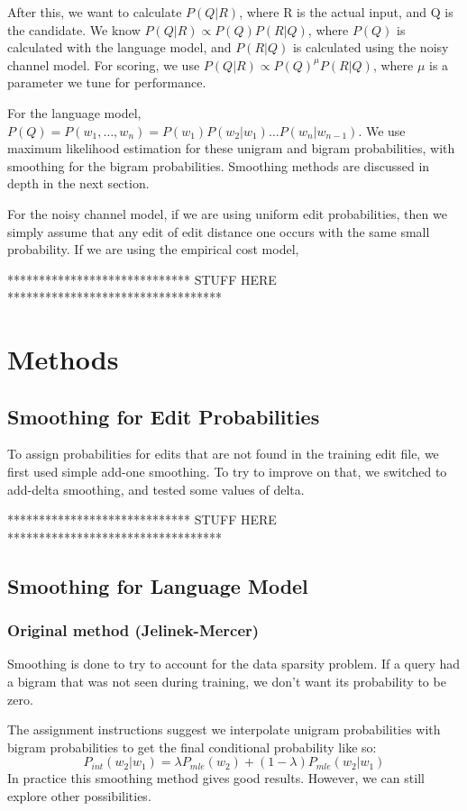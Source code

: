 \documentclass[10pt,twocolumn]{article}
\begin{document}
After this, we want to calculate $P(Q|R)$, where R is the actual input, and Q is the candidate. We know $P(Q|R)\propto P(Q)P(R|Q)$, where $P(Q)$ is calculated with the language model, and $P(R|Q)$ is calculated using the noisy channel model. For scoring, we use $P(Q|R)\propto P(Q)^\mu P(R|Q)$, where $\mu$ is a parameter we tune for performance.

For the language model, $P(Q)=P(w_1,\dots,w_n)=P(w_1)P(w_2|w_1)\dots P(w_n|w_{n-1})$. We use maximum likelihood estimation for these unigram and bigram probabilities, with smoothing for the bigram probabilities. Smoothing methods are discussed in depth in the next section.

For the noisy channel model, if we are using uniform edit probabilities, then we simply assume that any edit of edit distance one occurs with the same small probability. If we are using the empirical cost model, 

***************************** STUFF HERE **********************************
\section{Methods}
\subsection{Smoothing for Edit Probabilities}
To assign probabilities for edits that are not found in the training edit file, we first used simple add-one smoothing. To try to improve on that, we switched to add-delta smoothing, and tested some values of delta.

***************************** STUFF HERE **********************************
\subsection{Smoothing for Language Model}
\subsubsection{Original method (Jelinek-Mercer)}
Smoothing is done to try to account for the data sparsity problem. If a query had a bigram that was not seen during training, we don't want its probability to be zero.

The assignment instructions suggest we interpolate unigram probabilities with bigram probabilities to get the final conditional probability like so:
\begin{equation*}
P_{int}(w_2|w_1) = \lambda P_{mle}(w_2) + (1-\lambda)P_{mle}(w_2|w_1)
\end{equation*}
In practice this smoothing method gives good results. However, we can still explore other possibilities.
\end{document}

